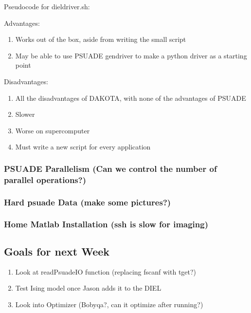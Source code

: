 \documentclass[11pt]{article} %
\begin{document}
Pseudocode for dieldriver.sh:


Advantages:
\begin{enumerate}
	\item Works out of the box, aside from writing the small script
	\item May be able to use PSUADE gendriver to make a python driver as a starting point
\end{enumerate}
Disadvantages:
\begin{enumerate}
	\item All the disadvantages of DAKOTA, with none of the advantages of PSUADE
	\item Slower
	\item Worse on supercomputer
	\item Must write a new script for every application
\end{enumerate}



\subsubsection{PSUADE Parallelism (Can we control the number of parallel operations?)}

\subsubsection{Hard psuade Data (make some pictures?)}

\subsubsection{Home Matlab Installation (ssh is slow for imaging)}



\subsection{Goals for next Week}
\begin{enumerate}
	\item Look at readPsuadeIO function (replacing fscanf with tget?)
	\item Test Ising model once Jason adds it to the DIEL
	\item Look into Optimizer (Bobyqa?, can it optimize after running?)
\end{enumerate}
\end{document}
